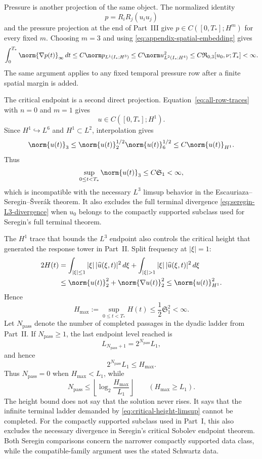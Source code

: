 Pressure is another projection of the same object.  The normalized identity
\[
 p=R_iR_j(u_i u_j)
\]
and the pressure projection at the end of Part~III give
\(p\in C([0,T_*];H^m)\) for every fixed \(m\).  Choosing \(m=3\) and using
\eqref{eq:appendix-spatial-embedding} gives
\begin{equation}
 \int_0^{T_*}\norm{\nabla p(t)}_\infty\,dt
 \le C\norm p_{L^1(I_*;H^3)}
 \le C\norm u_{L^2(I_*;H^4)}^2
 \le C\mathfrak R_{0,3}[u_0,\nu;T_*]<\infty.
 \label{eq:quantitative-pressure-action}
\end{equation}
The same argument applies to any fixed temporal pressure row after a finite
spatial margin is added.

The critical endpoint is a second direct projection.
Equation~\eqref{eq:all-row-traces} with \(n=0\) and \(m=1\) gives
\[
 u\in C([0,T_*];H^1).
\]
Since \(H^1\hookrightarrow L^6\) and \(H^1\subset L^2\), interpolation gives
\[
 \norm{u(t)}_3
 \le \norm{u(t)}_2^{1/2}\norm{u(t)}_6^{1/2}
 \le C\norm{u(t)}_{H^1}.
\]
Thus
\begin{equation}
 \sup_{0\le t<T_*}\norm{u(t)}_3
 \le C\mathfrak S_1<\infty,
 \label{eq:quantitative-L3-endpoint}
\end{equation}
which is incompatible with the necessary \(L^3\) limsup behavior in the
Escauriaza--Seregin--\v{S}ver\'ak theorem.  It also excludes the
full terminal divergence
\eqref{eq:seregin-L3-divergence} when \(u_0\) belongs to the compactly supported
subclass used for Seregin's full terminal theorem.

The \(H^1\) trace that bounds the \(L^3\) endpoint also controls the critical
height that generated the response tower in Part~II.  Split frequency at
\(|\xi|=1\):
\begin{align*}
 2H(t)
 &=\int_{|\xi|\le1}|\xi|\,|\widehat u(\xi,t)|^2\,d\xi
 +\int_{|\xi|>1}|\xi|\,|\widehat u(\xi,t)|^2\,d\xi\\
 &\le \norm{u(t)}_2^2+\norm{\nabla u(t)}_2^2
 \le \norm{u(t)}_{H^1}^2.
\end{align*}
Hence
\begin{equation}
 H_{\max}:=\sup_{0\le t<T_*}H(t)
 \le\frac12\mathfrak S_1^2<\infty.
 \label{eq:terminal-critical-height-bound}
\end{equation}
Let \(N_{\mathrm{pass}}\) denote the
number of completed passages in the dyadic ladder from Part~II.  If
\(N_{\mathrm{pass}}\ge1\), the last endpoint level reached is
\[
 L_{N_{\mathrm{pass}}+1}
 =2^{N_{\mathrm{pass}}}L_1,
\]
and hence
\[
 2^{N_{\mathrm{pass}}}L_1\le H_{\max}.
\]
Thus \(N_{\mathrm{pass}}=0\) when \(H_{\max}<L_1\), while
\[
 N_{\mathrm{pass}}
 \le\left\lfloor\log_2\frac{H_{\max}}{L_1}\right\rfloor
 \qquad(H_{\max}\ge L_1).
\]
The height bound does not say that the solution never rises.  It says that the
infinite terminal ladder demanded by \eqref{eq:critical-height-limsup} cannot
be completed.
For the compactly supported subclass used in Part~I, this also excludes the
necessary divergence in Seregin's critical Sobolev endpoint
theorem.  Both Seregin comparisons concern the
narrower compactly supported data class, while the compatible-family argument
uses the stated Schwartz data.

